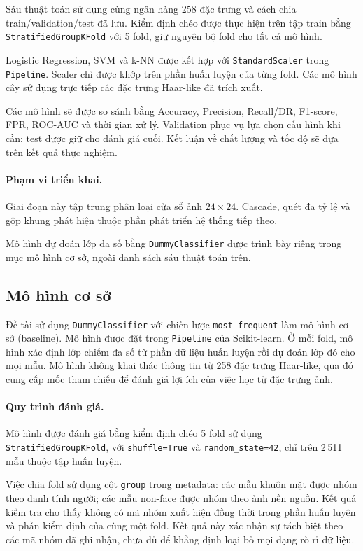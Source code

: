 \documentclass[12pt,a4paper,oneside]{report}
\begin{document}
Sáu thuật toán sử dụng cùng ngân hàng
258 đặc trưng và cách chia train/validation/test
đã lưu.
Kiểm định chéo được thực hiện trên tập train
bằng \texttt{StratifiedGroupKFold} với 5 fold,
giữ nguyên bộ fold cho tất cả mô hình.

Logistic Regression, SVM và k-NN được kết hợp
với \texttt{StandardScaler} trong \texttt{Pipeline}.
Scaler chỉ được khớp trên phần huấn luyện
của từng fold.
Các mô hình cây sử dụng trực tiếp
các đặc trưng Haar-like đã trích xuất.

Các mô hình sẽ được so sánh bằng Accuracy,
Precision, Recall/DR, F1-score, FPR, ROC-AUC
và thời gian xử lý.
Validation phục vụ lựa chọn cấu hình khi cần;
test được giữ cho đánh giá cuối.
Kết luận về chất lượng và tốc độ sẽ dựa
trên kết quả thực nghiệm.

\paragraph{Phạm vi triển khai.}

Giai đoạn này tập trung phân loại cửa sổ
ảnh $24 \times 24$.
Cascade, quét đa tỷ lệ và gộp khung phát hiện
thuộc phần phát triển hệ thống tiếp theo.

Mô hình dự đoán lớp đa số bằng
\texttt{DummyClassifier} được trình bày riêng
trong mục mô hình cơ sở, ngoài danh sách
sáu thuật toán trên.

\subsection{Mô hình cơ sở}
\label{subsec:mo_hinh_co_so}

Đề tài sử dụng \texttt{DummyClassifier} với chiến lược
\texttt{most\_frequent} làm mô hình cơ sở (baseline).
Mô hình được đặt trong \texttt{Pipeline} của Scikit-learn.
Ở mỗi fold, mô hình xác định lớp chiếm đa số từ phần dữ liệu
huấn luyện rồi dự đoán lớp đó cho mọi mẫu.
Mô hình không khai thác thông tin từ 258 đặc trưng Haar-like,
qua đó cung cấp mốc tham chiếu để đánh giá lợi ích của việc
học từ đặc trưng ảnh.

\paragraph{Quy trình đánh giá.}
Mô hình được đánh giá bằng kiểm định chéo 5 fold sử dụng
\texttt{StratifiedGroupKFold}, với
\texttt{shuffle=True} và \texttt{random\_state=42},
chỉ trên 2\,511 mẫu thuộc tập huấn luyện.

Việc chia fold sử dụng cột \texttt{group} trong metadata:
các mẫu khuôn mặt được nhóm theo danh tính người;
các mẫu non-face được nhóm theo ảnh nền nguồn.
Kết quả kiểm tra cho thấy không có mã nhóm xuất hiện đồng thời
trong phần huấn luyện và phần kiểm định của cùng một fold.
Kết quả này xác nhận sự tách biệt theo các mã nhóm đã ghi nhận,
chưa đủ để khẳng định loại bỏ mọi dạng rò rỉ dữ liệu.
\end{document}
